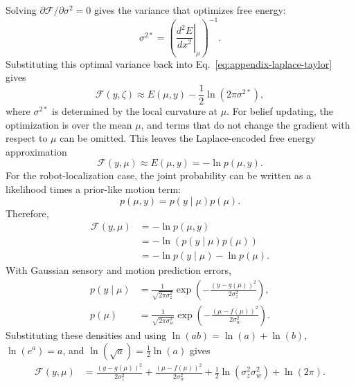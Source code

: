 Solving $\partial \mathcal{F}/\partial \sigma^2=0$ gives the variance that optimizes free energy:
\begin{equation}
    \sigma^{2*}
    =
    \left(
        \left.
        \frac{d^2E}{dx^2}
        \right|_{\mu}
    \right)^{-1}.
\end{equation}
Substituting this optimal variance back into Eq.~\ref{eq:appendix-laplace-taylor} gives
\begin{equation}
    \mathcal{F}(y,\zeta)
    \approx
    E(\mu,y)
    -
    \frac{1}{2}
    \ln\left(2\pi\sigma^{2*}\right),
\end{equation}
where $\sigma^{2*}$ is determined by the local curvature at $\mu$. For belief updating, the optimization is over the mean $\mu$, and terms that do not change the gradient with respect to $\mu$ can be omitted. This leaves the Laplace-encoded free energy approximation
\begin{equation}
    \mathcal{F}(y,\mu)
    \approx
    E(\mu,y)
    =
    -\ln p(\mu,y).
\end{equation}
For the robot-localization case, the joint probability can be written as a likelihood times a prior-like motion term:
\begin{equation}
    p(\mu,y)
    =
    p(y\mid\mu)p(\mu).
\end{equation}
Therefore,
\begin{align}
    \mathcal{F}(y,\mu)
    &=
    -\ln p(\mu,y)
    \nonumber \\
    &=
    -\ln\left(p(y\mid\mu)p(\mu)\right)
    \nonumber \\
    &=
    -\ln p(y\mid\mu)
    -
    \ln p(\mu).
\end{align}
With Gaussian sensory and motion prediction errors,
\begin{align}
    p(y\mid\mu)
    &=
    \frac{1}{\sqrt{2\pi\sigma_z^2}}
    \exp
    \left(
        -\frac{\left(y-g(\mu)\right)^2}{2\sigma_z^2}
    \right),
    \nonumber \\
    p(\mu)
    &=
    \frac{1}{\sqrt{2\pi\sigma_w^2}}
    \exp
    \left(
        -\frac{\left(\mu-f(\mu)\right)^2}{2\sigma_w^2}
    \right).
\end{align}
Substituting these densities and using $\ln(ab)=\ln(a)+\ln(b)$, $\ln(e^a)=a$, and $\ln(\sqrt{a})=\frac{1}{2}\ln(a)$ gives
\begin{align}
    \mathcal{F}(y,\mu)
    &=
    \frac{\left(y-g(\mu)\right)^2}{2\sigma_z^2}
    +
    \frac{\left(\mu-f(\mu)\right)^2}{2\sigma_w^2}
    +
    \frac{1}{2}\ln\left(\sigma_z^2\sigma_w^2\right)
    +
    \ln(2\pi).
\end{align}
